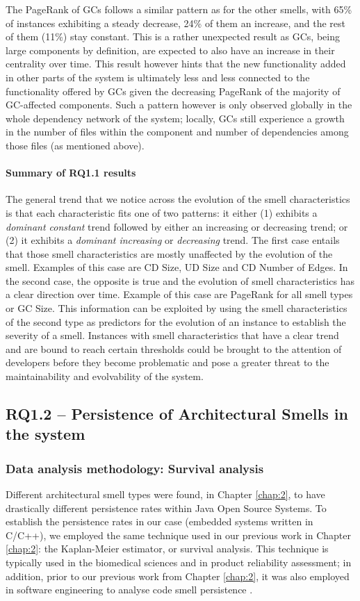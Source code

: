 The PageRank of GCs follows a similar pattern as for the other smells, with 65\% of instances exhibiting a steady decrease, 24\% of them an increase, and the rest of them (11\%) stay constant.
This is a rather unexpected result as GCs, being large components by definition, are expected to also have an increase in their centrality over time.
This result however hints that the new functionality added in other parts of the system is ultimately less and less connected to the functionality offered by GCs given the decreasing PageRank of the majority of GC-affected components.
Such a pattern however is only observed globally in the whole dependency network of the system; locally, GCs still experience a growth in the number of files within the component and number of dependencies among those files (as mentioned above).

\paragraph{Summary of RQ1.1 results}
The general trend that we notice across the evolution of the smell characteristics is that each characteristic fits one of two patterns: it either (1) exhibits a \emph{dominant constant} trend followed by either an increasing or decreasing trend; or (2) it exhibits a \emph{dominant increasing} or \emph{decreasing} trend. 
The first case entails that those smell characteristics are mostly unaffected by the evolution of the smell. Examples of this case are CD Size, UD Size and CD Number of Edges.
In the second case, the opposite is true and the evolution of smell characteristics has a clear direction over time. Example of this case are PageRank for all smell types or GC Size.
This information can be exploited by using the smell characteristics of the second type as predictors for the evolution of an instance to establish the severity of a smell.
Instances with smell characteristics that have a clear trend and are bound to reach certain thresholds could be brought to the attention of developers before they become problematic and pose a greater threat to the maintainability and evolvability of the system.

\subsection{RQ1.2 -- Persistence of Architectural Smells in the system}
\subsubsection{Data analysis methodology: Survival analysis}
Different architectural smell types were found, in Chapter \ref{chap:2}, to have drastically different persistence rates within Java Open Source Systems.
To establish the persistence rates in our case (embedded systems written in C/C++), we employed the same technique used in our previous work in Chapter \ref{chap:2}: the Kaplan-Meier estimator, or survival analysis.
This technique is typically used in the biomedical sciences and in product reliability assessment; in addition, prior to our previous work from Chapter \ref{chap:2}, it was also employed in software engineering to analyse code smell persistence \cite{Chatzigeorgiou2014}.

